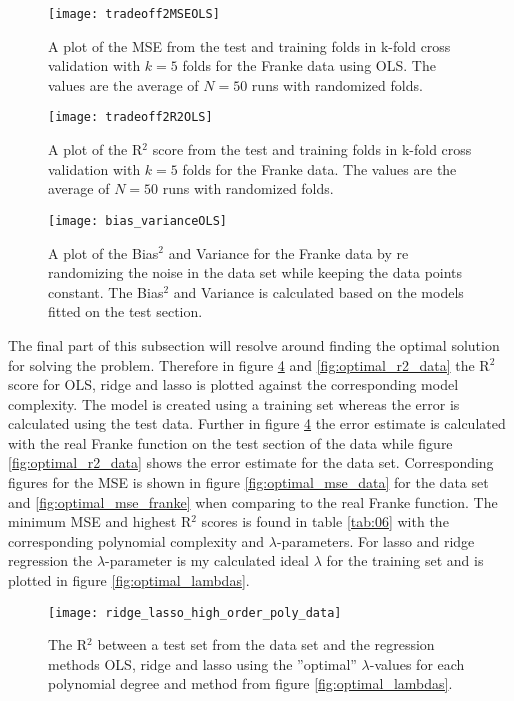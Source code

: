 \documentclass[uio,jmp,amsmath,amssymb,reprint,nofootinbib]{revtex4-1}
\numberwithin{equation}{section}
\begin{document}
\begin{figure}[H]
    \centering
    \texttt{[image: tradeoff2MSEOLS]}
    \caption{A plot of the MSE from the test and training folds in k-fold cross validation with \(k=5\) folds for the Franke data using OLS. The values are the average of \(N=50\) runs with randomized folds.}
    \label{fig:test_vs_train}
\end{figure}

\begin{figure}[H]
    \centering
    \texttt{[image: tradeoff2R2OLS]}
    \caption{A plot of the R\(^2\) score from the test and training folds in k-fold cross validation with \(k=5\) folds for the Franke data. The values are the average of \(N=50\) runs with randomized folds.}
    \label{fig:test_vs_trainR2}
\end{figure}


\begin{figure}[H]
    \centering
    \texttt{[image: bias\_varianceOLS]}
    \caption{A plot of the Bias\(^2\) and Variance for the Franke data by re randomizing the noise in the data set while keeping the data points constant. The  Bias\(^2\) and Variance is calculated based on the models fitted on the test section.}
    \label{fig:bias_varianceOLS}
\end{figure}

The final part of this subsection will resolve around finding the optimal solution for solving the problem. Therefore in figure \ref{fig:optimal_r2_franke} and \ref{fig:optimal_r2_data} the R\(^2\) score for OLS, ridge and lasso is plotted against the corresponding model complexity. The model is created using a training set whereas the error is calculated using the test data. Further in figure \ref{fig:optimal_r2_franke} the error estimate is calculated with the real Franke function on the test section of the data while figure \ref{fig:optimal_r2_data} shows the error estimate for the data set. Corresponding figures for the MSE is shown in figure \ref{fig:optimal_mse_data} for the data set and \ref{fig:optimal_mse_franke} when comparing to the real Franke function. The minimum MSE and highest R\(^2\) scores is found in table \ref{tab:06} with the corresponding polynomial complexity and \(\lambda\)-parameters. For lasso and ridge regression the \(\lambda\)-parameter is my calculated ideal \(\lambda\) for the training set and is plotted in figure \ref{fig:optimal_lambdas}.

\begin{figure}[H]
    \centering
    \texttt{[image: ridge\_lasso\_high\_order\_poly\_data]}
    \caption{The R\(^2\) between a test set from the data set and the regression methods OLS, ridge and lasso using the ''optimal'' \(\lambda\)-values for each polynomial degree and method from figure \ref{fig:optimal_lambdas}.}
    \label{fig:optimal_r2_franke}
\end{figure}
\end{document}
